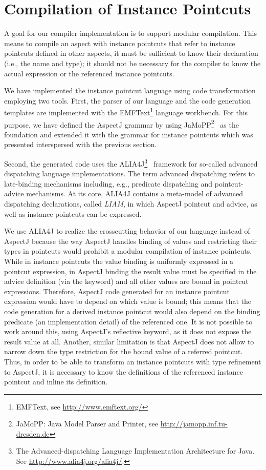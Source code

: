 \section{Compilation of Instance Pointcuts}
\label{sect:compilation}

A goal for our compiler implementation is to support modular compilation.
This means to compile an aspect with instance pointcuts that refer to instance pointcuts defined in other aspects, it must be sufficient to know their declaration (i.e., the name and type); it should not be necessary for the compiler to know the actual expression or the referenced instance pointcuts.

We have implemented the instance pointcut language using code transformation employing two tools.
First, the parser of our language and the code generation templates are implemented with the EMFText\footnote{EMFText, see \url{http://www.emftext.org/}} language workbench.
For this purpose, we have defined the AspectJ grammar by using JaMoPP\footnote{JaMoPP: Java Model Parser and Printer, see \url{http://jamopp.inf.tu-dresden.de}}~\cite{jamopp2010} as the foundation and extended it with the grammar for instance pointcuts which was presented interspersed with the previous section.

Second, the generated code uses the ALIA4J\footnote{The Advanced-dispatching Language Implementation Architecture for Java. See \url{http://www.alia4j.org/alia4j/}.}~\cite{Bockisch2012} framework for so-called advanced dispatching language implementations.
The term advanced dispatching refers to late-binding mechanisms including, e.g., predicate dispatching and pointcut-advice mechanisms.
At its core, ALIA4J contains a meta-model of advanced dispatching declarations, called \emph{LIAM}, in which AspectJ pointcut and advice, as well as instance pointcuts can be expressed.

We use ALIA4J to realize the crosscutting behavior of our language instead of AspectJ because the way AspectJ handles binding of values and restricting their types in pointcuts would prohibit a modular compilation of instance pointcuts.
While in instance pointcuts the value binding is uniformly expressed in a pointcut expression, in AspectJ binding the result value must be specified in the advice definition (via the  keyword) and all other values are bound in pointcut expressions.
Therefore, AspectJ code generated for an instance pointcut expression would have to depend on which value is bound; this means that the code generation for a derived instance pointcut would also depend on the binding predicate (an implementation detail) of the referenced one.
It is not possible to work around this, using AspectJ's reflective  keyword, as it does not expose the result value at all.
Another, similar limitation is that AspectJ does not allow to narrow down the type restriction for the bound value of a referred pointcut.
Thus, in order to be able to transform an instance pointcuts with type refinement to AspectJ, it is necessary to know the definitions of the referenced instance pointcut and inline its definition.

